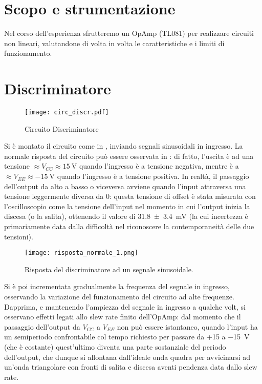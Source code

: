 \section{Scopo e strumentazione}

Nel corso dell'esperienza sfrutteremo un OpAmp (TL081) per realizzare circuiti non lineari, valutandone di volta in volta le caratteristiche e i limiti di funzionamento.

\section{Discriminatore}

\begin{figure}[h]
	\centering
	\texttt{[image: circ\_discr.pdf]}
	\caption{Circuito Discriminatore}
	\label{f:discr}
\end{figure}

Si è montato il circuito come in , inviando segnali sinusoidali in ingresso. La normale risposta del circuito può essere osservata in : di fatto, l'uscita è ad una tensione $\approx V_{CC} \approx \SI{15}{\V}$ quando l'ingresso è a tensione negativa, mentre è a $\approx V_{EE} \approx \SI{-15}{\V}$ quando l'ingresso è a tensione positiva. In realtà, il passaggio dell'output da alto a basso o viceversa avviene quando l'input attraversa una tensione leggermente diversa da 0: questa tensione di offset è stata misurata con l'oscilloscopio come la tensione dell'input nel momento in cui l'output inizia la discesa (o la salita), ottenendo il valore di \SI{31.8(34)}{\mV} (la cui incertezza è primariamente data dalla difficoltà nel riconoscere la contemporaneità delle due tensioni).

\begin{figure}
	\centering
	\texttt{[image: risposta\_normale\_1.png]}
	\caption{Risposta del discriminatore ad un segnale sinusoidale.}
	\label{f:discr_normale}
\end{figure}

Si è poi incrementata gradualmente la frequenza del segnale in ingresso, osservando la variazione del funzionamento del circuito ad alte frequenze.
Dapprima, e mantenendo l'ampiezza del segnale in ingresso a qualche volt, si osservano effetti legati allo slew rate finito dell'OpAmp: dal momento che il passaggio dell'output da $V_{CC}$ a $V_{EE}$ non può essere istantaneo, quando l'input ha un semiperiodo confrontabile col tempo richiesto per passare da +15 a \SI{-15}{\V} (che è costante) quest'ultimo diventa una parte sostanziale del periodo dell'output, che dunque si allontana dall'ideale onda quadra per avvicinarsi ad un'onda triangolare con fronti di salita e discesa aventi pendenza data dallo slew rate. %

